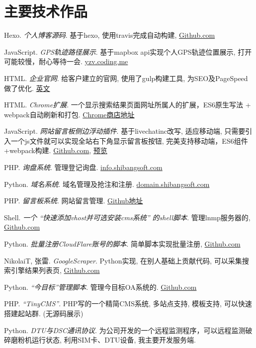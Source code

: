 
\section{\textbf{主要技术作品}}
 \resumeSubHeadingListStart
    \item{
       Hexo.
       \emph{个人博客源码}.
       基于hexo, 使用travis完成自动构建, \href{https://github.com/sbmzhcn/sbmzhcn.github.io/tree/source}{Github.com}
   }
   \item{
       JavaScript.
       \emph{GPS轨迹路径展示}.
       基于mapbox api实现个人GPS轨迹位置展示, 打开可能较慢，耐心等待一会. \href{http://yzv.coding.me/#portfolio/portfolio-4}{yzv.coding.me}
   }
   \item{
       HTML.
       \emph{企业官网}.
       给客户建立的官网, 使用了gulp构建工具, 为SEO及PageSpeed做了优化. \href{https://www.kamychina.com/}{英文}
   }
   \item{
       HTML.
       \emph{Chrome扩展}.
       一个显示搜索结果页面网址所属人的扩展，ES6原生写法 + webpack自动刷新和打包. \href{https://chrome.google.com/webstore/detail/ifbiiojnbgljbjffmacihhdkeomdkifc}{Chrome商店地址}
   }
   \item{
       JavaScript.
       \emph{网站留言板侧边浮动插件}.
       基于livechatinc改写, 适应移动端, 只需要引入一个js文件就可以实现全站右下角显示留言板按钮, 完美支持移动端，ES6组件+webpack构建. \href{https://github.com/sbmzhcn/sbmzhcn.github.io/tree/master/livechat}{Github.com},
       \href{https://www.kamychina.com/}{预览}
   }
   \item{
       PHP.
       \emph{询盘系统}.
       管理登记询盘. \href{http://info.shibangsoft.com}{info.shibangsoft.com}
   }
   \item{
       Python.
       \emph{域名系统}.
       域名管理及抢注和注册. \href{http://domain.shibangsoft.com}{domain.shibangsoft.com}
   }
   \item{
       PHP.
       \emph{留言板系统}.
       网站留言管理.  \href{https://github.com/sbmzhcn/inquiry}{Github地址}
   }
   \item{
       Shell.
       \emph{一个 ``快速添加vhost并可选安装cms系统'' 的shell脚本}.
       管理lnmp服务器的, \href{https://github.com/sbmzhcn/Tools}{Github.com}
   }
   \item{
       Python.
       \emph{批量注册CloudFlare账号的脚本}.
       简单脚本实现批量注册, \href{https://github.com/sbmzhcn/cloudflare}{Github.com}
   }
   \item{
       NikolaiT, 张雷.
       \emph{GoogleScraper}.
       Python实现, 在别人基础上贡献代码, 可以采集搜索引擎结果列表页, \href{https://github.com/NikolaiT/GoogleScraper/blob/master/AUTHORS}{Github.com}
   }
   \item{
       Python.
       \emph{``今目标''管理脚本}.
       管理今目标OA系统的. \href{https://github.com/sbmzhcn/Jingoal}{Github.com}
   }
   \item{
       PHP.
       \emph{``TinyCMS''}.
       PHP写的一个精简CMS系统, 多站点支持, 模板支持, 可以快速搭建起站群. (无源码展示)
   }
   \item{
       Python.
       \emph{DTU与DSC通讯协议}.
       为公司开发的一个远程监测程序，可以远程监测破碎磨粉机运行状态, 利用SIM卡、DTU设备, 我主要开发服务端.
   }

 \resumeSubHeadingListEnd
